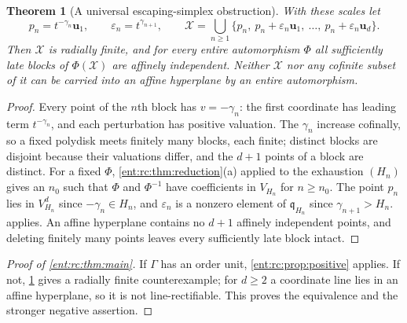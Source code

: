 \documentclass[11pt]{article}
\newtheorem{theorem}{Theorem}[section]
\theoremstyle{plain}
\theoremstyle{plain}
\theoremstyle{plain}
\theoremstyle{definition}
\theoremstyle{definition}
\theoremstyle{definition}
\theoremstyle{definition}
\theoremstyle{remark}
\begin{document}
\begin{theorem}[A universal escaping-simplex obstruction]
\label{ent:rc:thm:obstruction}
With these scales let
\begin{equation}\label{ent:rc:eq:Dexplicit}
 p_n=t^{-\gamma_n}\mathbf u_1,\qquad\varepsilon_n=t^{\gamma_{n+1}},\qquad
 \mathcal X=\bigcup_{n\ge1}\{p_n,\ p_n+\varepsilon_n\mathbf u_1,\ \ldots,\
 p_n+\varepsilon_n\mathbf u_d\}.
\end{equation}
Then $\mathcal X$ is radially finite, and for every entire automorphism
$\Phi$ all sufficiently late blocks of $\Phi(\mathcal X)$ are affinely
independent. Neither $\mathcal X$ nor any cofinite subset of it can be carried
into an affine hyperplane by an entire automorphism.
\end{theorem}
\begin{proof}
Every point of the $n$th block has $v=-\gamma_n$: the first coordinate has
leading term $t^{-\gamma_n}$, and each perturbation has positive valuation.
The $\gamma_n$ increase cofinally, so a fixed polydisk meets finitely many
blocks, each finite; distinct blocks are disjoint because their valuations
differ, and the $d+1$ points of a block are distinct. For a fixed $\Phi$,
\cref{ent:rc:thm:reduction}(a) applied to the exhaustion $(H_n)$ gives an
$n_0$ such that $\Phi$ and $\Phi^{-1}$ have coefficients in $V_{H_n}$ for
$n\ge n_0$. The point $p_n$ lies in $V_{H_n}^d$ since
$-\gamma_n\in H_n$, and $\varepsilon_n$ is a nonzero element of
$\mathfrak q_{H_n}$ since $\gamma_{n+1}>H_n$. 
applies. An affine hyperplane contains no $d+1$ affinely independent points,
and deleting finitely many points leaves every sufficiently late block intact.
\end{proof}

\begin{proof}[Proof of \cref{ent:rc:thm:main}]
If $\Gamma$ has an order unit, \cref{ent:rc:prop:positive} applies. If not,
\cref{ent:rc:thm:obstruction} gives a radially finite counterexample; for
$d\ge2$ a coordinate line lies in an affine hyperplane, so it is not
line-rectifiable. This proves the equivalence and the stronger negative
assertion.
\end{proof}
\end{document}
